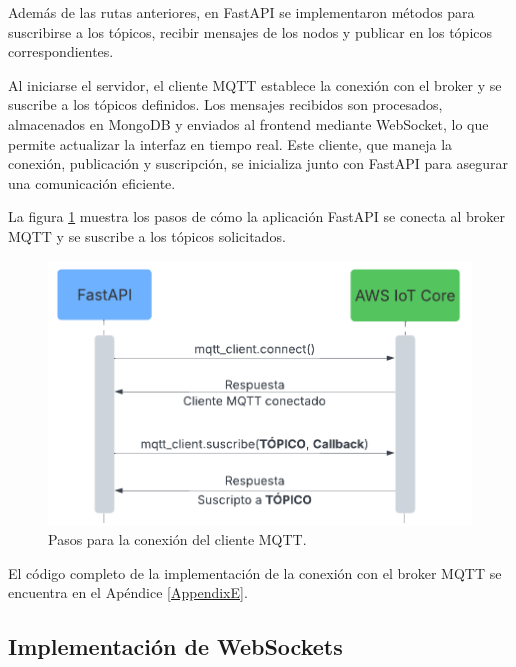 Además de las rutas anteriores, en FastAPI se implementaron métodos para
suscribirse a los tópicos, recibir mensajes de los nodos y publicar en los
tópicos correspondientes.

Al iniciarse el servidor, el cliente MQTT establece la conexión con el broker y
se suscribe a los tópicos definidos. Los mensajes recibidos son procesados,
almacenados en MongoDB y enviados al frontend mediante WebSocket, lo que
permite actualizar la interfaz en tiempo real. Este cliente, que maneja la
conexión, publicación y suscripción, se inicializa junto con FastAPI para
asegurar una comunicación eficiente.

La figura \ref{fig:cliente_mqtt} muestra los pasos de cómo la aplicación
FastAPI se conecta al broker MQTT y se suscribe a los tópicos solicitados.

\begin{figure}[H]
    \centering
    \includegraphics[width=.90\textwidth]{./Images/22.png}
    \caption{Pasos para la conexión del cliente MQTT.}
    \label{fig:cliente_mqtt}
\end{figure}



El código completo de la implementación de la conexión con el broker MQTT se
encuentra en el Apéndice \ref{AppendixE}.

\subsection{Implementación de WebSockets}

